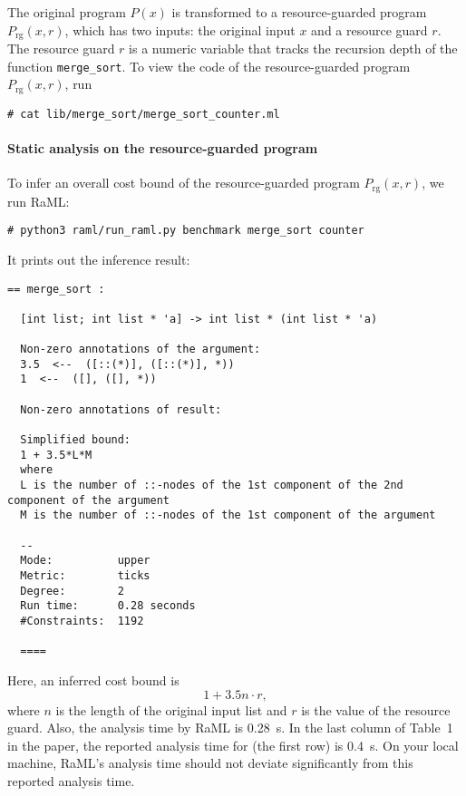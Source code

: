 The original program $P(x)$ is transformed to a resource-guarded program
$P_{\mathrm{rg}}(x, r)$, which has two inputs: the original input $x$ and a
resource guard $r$.
%
The resource guard $r$ is a numeric variable that tracks the recursion depth of
the function \texttt{merge\_sort}.
%
To view the code of the resource-guarded program $P_{\mathrm{rg}}(x, r)$, run
\begin{verbatim}
# cat lib/merge_sort/merge_sort_counter.ml
\end{verbatim}

\paragraph{Static analysis on the resource-guarded program}

To infer an overall cost bound of the resource-guarded program
$P_{\mathrm{rg}}(x, r)$, we run RaML:
\begin{verbatim}
# python3 raml/run_raml.py benchmark merge_sort counter
\end{verbatim}
%
It prints out the inference result:
\begin{Verbatim}[fontsize=\footnotesize]
  == merge_sort :

  [int list; int list * 'a] -> int list * (int list * 'a)

  Non-zero annotations of the argument:
  3.5  <--  ([::(*)], ([::(*)], *))
  1  <--  ([], ([], *))

  Non-zero annotations of result:

  Simplified bound:
  1 + 3.5*L*M
  where
  L is the number of ::-nodes of the 1st component of the 2nd component of the argument
  M is the number of ::-nodes of the 1st component of the argument

  --
  Mode:          upper
  Metric:        ticks
  Degree:        2
  Run time:      0.28 seconds
  #Constraints:  1192

  ====
\end{Verbatim}
%
Here, an inferred cost bound is
\begin{equation}
  1 + 3.5 n \cdot r,
\end{equation}
where $n$ is the length of the original input list and $r$ is the value of the
resource guard.
%
Also, the analysis time by RaML is \qty{0.28}{\second}.
%
In the last column of Table~1 in the paper, the reported analysis time for
\mergesort{} (the first row) is \qty{0.4}{\second}.
%
On your local machine, RaML's analysis time should not deviate significantly
from this reported analysis time.

